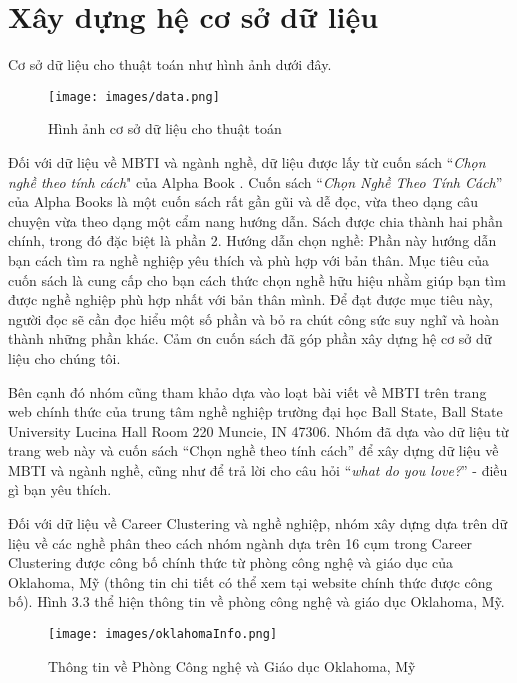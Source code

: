 \section{Xây dựng hệ cơ sở dữ liệu}\label{3.1}
Cơ sở dữ liệu cho thuật toán như hình ảnh dưới đây. 

\begin{figure}[H]
        \centering
        \texttt{[image: images/data.png]}
        \vspace{0.6cm}
        \caption{Hình ảnh cơ sở dữ liệu cho thuật toán}
    \end{figure}

Đối với dữ liệu về MBTI và ngành nghề, dữ liệu được lấy từ cuốn sách ``\textit{Chọn nghề theo tính cách}" của Alpha Book \cite{alpha}. Cuốn sách ``\textit{Chọn Nghề Theo Tính Cách}” của Alpha Books là một cuốn sách rất gần gũi và dễ đọc, vừa theo dạng câu chuyện vừa theo dạng một cẩm nang hướng dẫn. Sách được chia thành hai phần chính, trong đó đặc biệt là phần 2. Hướng dẫn chọn nghề: Phần này hướng dẫn bạn cách tìm ra nghề nghiệp yêu thích và phù hợp với bản thân. Mục tiêu của cuốn sách là cung cấp cho bạn cách thức chọn nghề hữu hiệu nhằm giúp bạn tìm được nghề nghiệp phù hợp nhất với bản thân mình. Để đạt được mục tiêu này, người đọc sẽ cần đọc hiểu một số phần và bỏ ra chút công sức suy nghĩ và hoàn thành những phần khác. Cảm ơn cuốn sách đã góp phần xây dựng hệ cơ sở dữ liệu cho chúng tôi. 

Bên cạnh đó nhóm cũng tham khảo dựa vào loạt bài viết về MBTI trên trang web chính thức của trung tâm nghề nghiệp trường đại học Ball State, Ball State University Lucina Hall Room 220 Muncie, IN 47306. Nhóm đã dựa vào dữ liệu từ trang web này và cuốn sách ``Chọn nghề theo tính cách” để xây dựng dữ liệu về MBTI và ngành nghề, cũng như để trả lời cho câu hỏi ``\textit{what do you love?}” - điều gì bạn yêu thích. 

Đối với dữ liệu về Career Clustering và nghề nghiệp, nhóm xây dựng dựa trên dữ liệu về các nghề phân theo cách nhóm ngành dựa trên 16 cụm trong Career Clustering được công bố chính thức từ phòng công nghệ và giáo dục của Oklahoma, Mỹ (thông tin chi tiết có thể xem tại website chính thức được công bố). Hình 3.3 thể hiện thông tin về phòng công nghệ và giáo dục Oklahoma, Mỹ.

\begin{figure}[H]
    \centering
    \texttt{[image: images/oklahomaInfo.png]}
    \vspace{0.5cm}
    \caption{Thông tin về Phòng Công nghệ và Giáo dục Oklahoma, Mỹ}
\end{figure}

